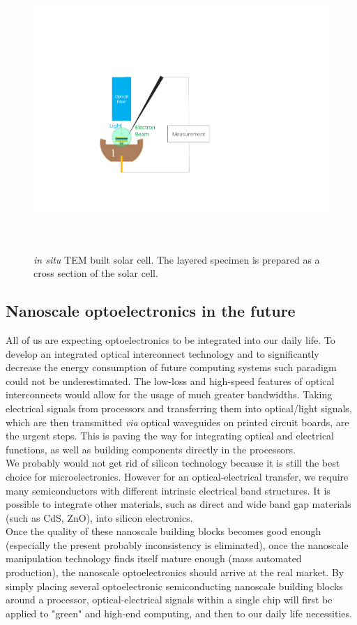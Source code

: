 \begin{figure}  
\centering
\includegraphics[height=300pt, angle=-90]{figures/figure7_sc}
\caption[\textit{In situ} solar cell]{\textit{in situ} TEM built solar cell. The layered specimen is prepared as a cross section of the solar cell.
\label{fig:7_sc}}
\end{figure}

\subsection{Nanoscale optoelectronics in the future}
All of us are expecting optoelectronics to be integrated into our daily life. To develop an integrated optical interconnect technology and to significantly decrease the energy consumption of future computing systems such paradigm could not be underestimated. The low-loss and high-speed features of optical interconnects would allow for the usage of much greater bandwidths. Taking electrical signals from processors and transferring them into optical/light signals, which are then transmitted \textit{via} optical waveguides on printed circuit boards, are the urgent steps. This is paving the way for integrating optical and electrical functions, as well as building components directly in the processors. \\
We probably would not get rid of silicon technology because it is still the best choice for microelectronics. However for an optical-electrical transfer, we require many semiconductors with different intrinsic electrical band structures. It is possible to integrate other materials, such as direct and wide band gap materials (such as CdS, ZnO), into silicon electronics. \\
Once the quality of these nanoscale building blocks becomes good enough (especially the present probably inconsistency is eliminated), once the nanoscale manipulation technology finds itself mature enough (mass automated production), the nanoscale optoelectronics should arrive at the real market. By simply placing several optoelectronic semiconducting nanoscale building blocks around a processor, optical-electrical signals within a single chip will first be applied to "green" and high-end computing, and then to our daily life necessities. 

